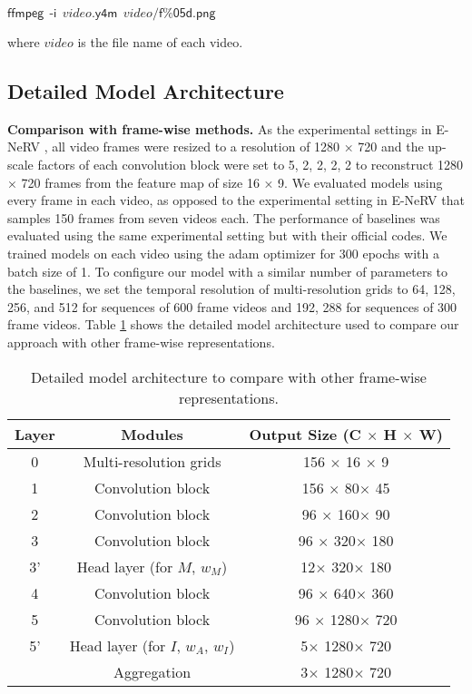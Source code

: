\documentclass[sigconf]{acmart}
\begin{document}
$\mathsf{ffmpeg\,\; \text{-}i\,\;} video\mathsf{.y4m\,\;} video\mathsf{/f\%05d.png}$

\noindent where $video$ is the file name of each video.

\subsection{Detailed Model Architecture}
\noindent\textbf{Comparison with frame-wise methods.}
As the experimental settings in E-NeRV \cite{enerv},
all video frames were resized to a resolution of 1280 × 720 and the up-scale factors of each convolution block were set to 5, 2, 2, 2, 2 to reconstruct 1280 × 720 frames from the feature map of size 16 × 9.
We evaluated models using every frame in each video, as opposed to the experimental setting in E-NeRV that samples 150 frames from seven videos each.
The performance of baselines was evaluated using the same experimental setting but with their official codes.
We trained models on each video using the adam optimizer for 300 epochs with a batch size of 1.
To configure our model with a similar number of parameters to the baselines, we set the temporal resolution of multi-resolution grids to 64, 128, 256, and 512 for sequences of 600 frame videos and 192, 288 for sequences of 300 frame videos.
Table \ref{fig_fw} shows the detailed model architecture used to compare our approach with other frame-wise representations.
\begin{table}[h]
\centering
\caption{Detailed model architecture to compare with other frame-wise representations.}
\vskip 0.1in
\begin{tabular}{c|c|c}
\hline
Layer & Modules                    & Output Size (C $\times$ H $\times$ W)    \\ \hline\hline
0     & Multi-resolution grids     & 156 $\times$ 16 $\times$ 9                 \\
1     & Convolution block                 & 156 $\times$ 80$\times$ 45                \\
2     & Convolution block              & 96 $\times$ 160$\times$ 90    \\
3     & Convolution block              & 96 $\times$ 320$\times$ 180    \\
3'    & Head layer (for $M$, $w_M$)     & 12$\times$ 320$\times$ 180             \\
4     & Convolution block              & 96 $\times$ 640$\times$ 360    \\
5     & Convolution block              & 96 $\times$ 1280$\times$ 720 \\
5'    & Head layer (for $I$, $w_A$, $w_I$) & 5$\times$ 1280$\times$ 720  \\
& Aggregation & 3$\times$ 1280$\times$ 720 \\
\hline
\end{tabular}
\label{fig_fw}
\end{table}
\end{document}
